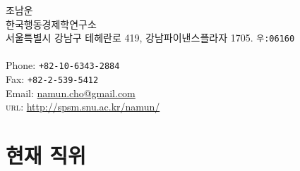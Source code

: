 \documentclass[11pt, a4paper]{article} %
\begin{document}

{\LARGE 조남운}\\[1cm] %
한국행동경제학연구소\\ %
서울특별시 강남구 테헤란로 419, 강남파이낸스플라자 1705. \texttt{우:06160}\\
\\[.2cm]
Phone: \texttt{+82-10-6343-2884}\\ %
Fax: \texttt{+82-2-539-5412}\\[.2cm] %
Email: \href{mailto:namun.cho@gmail.com}{namun.cho@gmail.com}\\ %
\textsc{url}: \href{http://spsm.snu.ac.kr/namun/}{http://spsm.snu.ac.kr/namun/}\\ %






\section*{현재 직위}
\end{document}

